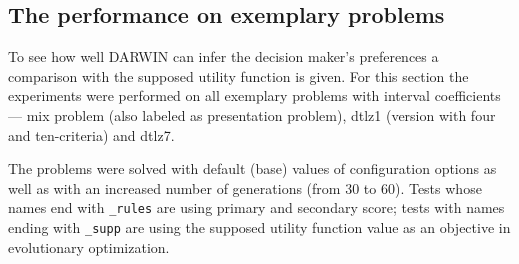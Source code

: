 \subsection{The performance on exemplary problems}
To see how well DARWIN can infer the decision maker's preferences a comparison
with the supposed utility function is given. For this section the experiments
were performed on all exemplary problems with interval coefficients --- mix
problem (also labeled as presentation problem), dtlz1 (version with four and
ten-criteria) and dtlz7.

The problems were solved with default (base) values of configuration options
as well as with an increased number of generations (from $30$ to $60$). Tests
whose names end with \texttt{\_rules} are using primary and secondary score;
tests with names ending with \texttt{\_supp} are using the supposed utility
function value as an objective in evolutionary optimization.

